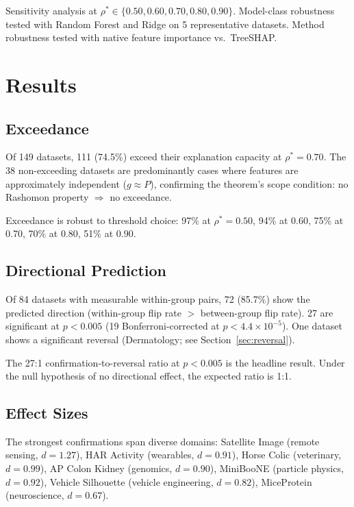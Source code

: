\documentclass[11pt]{article}
\begin{document}
Sensitivity analysis at $\rho^* \in \{0.50, 0.60, 0.70, 0.80, 0.90\}$.
Model-class robustness tested with Random Forest and Ridge on 5
representative datasets.  Method robustness tested with native feature
importance vs.\ TreeSHAP.

\section{Results}

\subsection{Exceedance}

Of 149 datasets, 111 (74.5\%) exceed their explanation capacity at
$\rho^* = 0.70$.  The 38 non-exceeding datasets are predominantly cases
where features are approximately independent ($g \approx P$), confirming
the theorem's scope condition: no Rashomon property $\Rightarrow$ no
exceedance.

Exceedance is robust to threshold choice: 97\% at $\rho^* = 0.50$,
94\% at 0.60, 75\% at 0.70, 70\% at 0.80, 51\% at 0.90.

\subsection{Directional Prediction}

Of 84 datasets with measurable within-group pairs, 72 (85.7\%) show the
predicted direction (within-group flip rate $>$ between-group flip rate).
27 are significant at $p < 0.005$ (19 Bonferroni-corrected at
$p < 4.4 \times 10^{-5}$).  One dataset shows a significant reversal
(Dermatology; see Section~\ref{sec:reversal}).

The 27:1 confirmation-to-reversal ratio at $p < 0.005$ is the headline
result.  Under the null hypothesis of no directional effect, the expected
ratio is 1:1.

\subsection{Effect Sizes}

The strongest confirmations span diverse domains: Satellite Image (remote
sensing, $d = 1.27$), HAR Activity (wearables, $d = 0.91$), Horse Colic
(veterinary, $d = 0.99$), AP Colon Kidney (genomics, $d = 0.90$),
MiniBooNE (particle physics, $d = 0.92$), Vehicle Silhouette (vehicle
engineering, $d = 0.82$), MiceProtein (neuroscience, $d = 0.67$).
\end{document}
